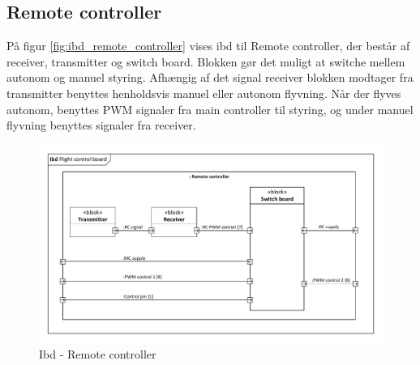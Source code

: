 \subsection{Remote controller}

På figur \ref{fig:ibd_remote_controller} vises ibd til Remote controller, der består af receiver, transmitter og switch board. Blokken gør det muligt at switche mellem autonom og manuel styring. Afhængig af det signal receiver blokken modtager fra transmitter benyttes henholdsvis manuel eller autonom flyvning. Når der flyves autonom, benyttes PWM signaler fra main controller til styring, og under manuel flyvning benyttes signaler fra receiver.

\begin{figure}[H]
\centering
\includegraphics[width=1\textwidth]{Billeder/IBD/ibd7_remotecontroller.pdf}
\vspace{-1cm}
\caption{Ibd - Remote controller}
\label{fig:ibd_remotecontroller}
\end{figure}

